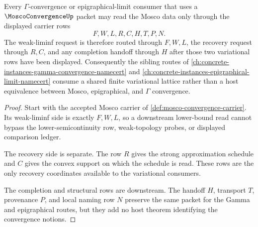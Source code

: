 \begin{theorem}
\label{thm:mosco-to-gamma-variational-dependency-route}
Every $\Gamma$-convergence or epigraphical-limit consumer that uses a $\MoscoConvergenceUp$ packet may read the Mosco data only through the displayed carrier rows
$$
F,W,L,R,C,H,T,P,N .
$$
The weak-liminf request is therefore routed through $F,W,L$, the recovery request through $R,C$, and any completion handoff through $H$ after those two variational rows have been displayed. Consequently the sibling routes of \autoref{ch:concrete-instances-gamma-convergence-namecert} and \autoref{ch:concrete-instances-epigraphical-limit-namecert} consume a shared finite variational lattice rather than a host equivalence between Mosco, epigraphical, and $\Gamma$ convergence.
\end{theorem}
\begin{proof}
Start with the accepted Mosco carrier of \autoref{def:mosco-convergence-carrier}. Its weak-liminf side is exactly $F,W,L$, so a downstream lower-bound read cannot bypass the lower-semicontinuity row, weak-topology probes, or displayed comparison ledger.

The recovery side is separate. The row $R$ gives the strong approximation schedule and $C$ gives the convex support on which the schedule is read. These rows are the only recovery coordinates available to the variational consumers.

The completion and structural rows are downstream. The handoff $H$, transport $T$, provenance $P$, and local naming row $N$ preserve the same packet for the Gamma and epigraphical routes, but they add no host theorem identifying the convergence notions.
\end{proof}
